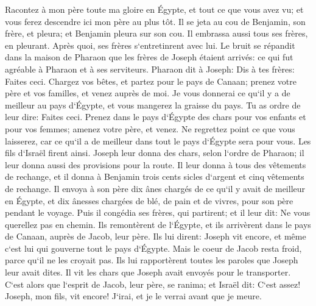 \verse Racontez à mon père toute ma gloire en Égypte, et tout ce que vous avez vu; et vous ferez descendre ici mon père au plus tôt. 
\verse Il se jeta au cou de Benjamin, son frère, et pleura; et Benjamin pleura sur son cou. 
\verse Il embrassa aussi tous ses frères, en pleurant. Après quoi, ses frères s`entretinrent avec lui. 
\verse Le bruit se répandit dans la maison de Pharaon que les frères de Joseph étaient arrivés: ce qui fut agréable à Pharaon et à ses serviteurs. 
\verse Pharaon dit à Joseph: Dis à tes frères: Faites ceci. Chargez vos bêtes, et partez pour le pays de Canaan; 
\verse prenez votre père et vos familles, et venez auprès de moi. Je vous donnerai ce qu`il y a de meilleur au pays d`Égypte, et vous mangerez la graisse du pays. 
\verse Tu as ordre de leur dire: Faites ceci. Prenez dans le pays d`Égypte des chars pour vos enfants et pour vos femmes; amenez votre père, et venez. 
\verse Ne regrettez point ce que vous laisserez, car ce qu`il a de meilleur dans tout le pays d`Égypte sera pour vous. 
\verse Les fils d`Israël firent ainsi. Joseph leur donna des chars, selon l`ordre de Pharaon; il leur donna aussi des provisions pour la route. 
\verse Il leur donna à tous des vêtements de rechange, et il donna à Benjamin trois cents sicles d`argent et cinq vêtements de rechange. 
\verse Il envoya à son père dix ânes chargés de ce qu`il y avait de meilleur en Égypte, et dix ânesses chargées de blé, de pain et de vivres, pour son père pendant le voyage. 
\verse Puis il congédia ses frères, qui partirent; et il leur dit: Ne vous querellez pas en chemin. 
\verse Ils remontèrent de l`Égypte, et ils arrivèrent dans le pays de Canaan, auprès de Jacob, leur père. 
\verse Ils lui dirent: Joseph vit encore, et même c`est lui qui gouverne tout le pays d`Égypte. Mais le coeur de Jacob resta froid, parce qu`il ne les croyait pas. 
\verse Ils lui rapportèrent toutes les paroles que Joseph leur avait dites. Il vit les chars que Joseph avait envoyés pour le transporter. C`est alors que l`esprit de Jacob, leur père, se ranima; 
\verse et Israël dit: C`est assez! Joseph, mon fils, vit encore! J`irai, et je le verrai avant que je meure. 

